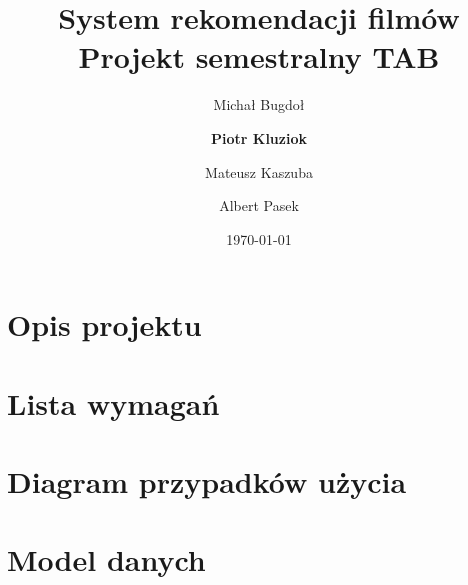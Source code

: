 \documentclass[12pt]{article}
\begin{document}
\title{
{System rekomendacji filmów}\\
{\large Projekt semestralny TAB}\\
}
\author{
	Michał Bugdoł
	\and
	\textbf{Piotr Kluziok}
	\and
	Mateusz Kaszuba
	\and
	Albert Pasek
}
\date{\today}

\maketitle
\newpage

\tableofcontents
\newpage

\section{Opis projektu}


\section{Lista wymagań}


\section{Diagram przypadków użycia}


\section{Model danych}

\end{document}
